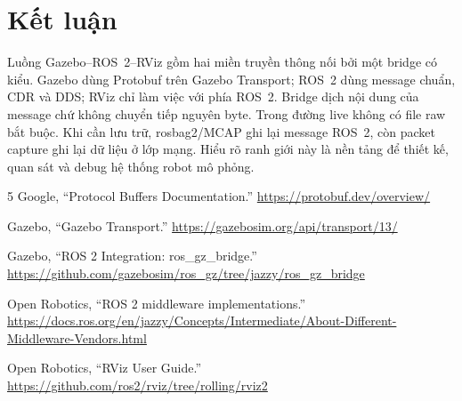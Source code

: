\documentclass[a4paper]{article}
\begin{document}
\section{Kết luận}

Luồng Gazebo--ROS~2--RViz gồm hai miền truyền thông nối bởi một bridge có kiểu. Gazebo dùng Protobuf trên Gazebo Transport; ROS~2 dùng message chuẩn, CDR và DDS; RViz chỉ làm việc với phía ROS~2. Bridge dịch nội dung của message chứ không chuyển tiếp nguyên byte. Trong đường live không có file raw bắt buộc. Khi cần lưu trữ, rosbag2/MCAP ghi lại message ROS~2, còn packet capture ghi lại dữ liệu ở lớp mạng. Hiểu rõ ranh giới này là nền tảng để thiết kế, quan sát và debug hệ thống robot mô phỏng.

\begin{thebibliography}{5}
Google, ``Protocol Buffers Documentation.''
\url{https://protobuf.dev/overview/}

Gazebo, ``Gazebo Transport.''
\url{https://gazebosim.org/api/transport/13/}

Gazebo, ``ROS 2 Integration: ros\_gz\_bridge.''
\url{https://github.com/gazebosim/ros_gz/tree/jazzy/ros_gz_bridge}

Open Robotics, ``ROS 2 middleware implementations.''
\url{https://docs.ros.org/en/jazzy/Concepts/Intermediate/About-Different-Middleware-Vendors.html}

Open Robotics, ``RViz User Guide.''
\url{https://github.com/ros2/rviz/tree/rolling/rviz2}
\end{thebibliography}
\end{document}
